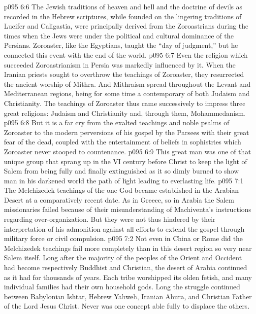 \vs p095 6:6 The Jewish traditions of heaven and hell and the doctrine of devils as recorded in the Hebrew scriptures, while founded on the lingering traditions of Lucifer and Caligastia, were principally derived from the Zoroastrians during the times when the Jews were under the political and cultural dominance of the Persians. Zoroaster, like the Egyptians, taught the “day of judgment,” but he connected this event with the end of the world.
\vs p095 6:7 Even the religion which succeeded Zoroastrianism in Persia was markedly influenced by it. When the Iranian priests sought to overthrow the teachings of Zoroaster, they resurrected the ancient worship of Mithra. And Mithraism spread throughout the Levant and Mediterranean regions, being for some time a contemporary of both Judaism and Christianity. The teachings of Zoroaster thus came successively to impress three great religions: Judaism and Christianity and, through them, Mohammedanism.
\vs p095 6:8 \pc But it is a far cry from the exalted teachings and noble psalms of Zoroaster to the modern perversions of his gospel by the Parsees with their great fear of the dead, coupled with the entertainment of beliefs in sophistries which Zoroaster never stooped to countenance.
\vs p095 6:9 This great man was one of that unique group that sprang up in the VI century before Christ to keep the light of Salem from being fully and finally extinguished as it so dimly burned to show man in his darkened world the path of light leading to everlasting life.
\vs p095 7:1 The Melchizedek teachings of the one God became established in the Arabian Desert at a comparatively recent date. As in Greece, so in Arabia the Salem missionaries failed because of their misunderstanding of Machiventa’s instructions regarding over\hyp{}organization. But they were not thus hindered by their interpretation of his admonition against all efforts to extend the gospel through military force or civil compulsion.
\vs p095 7:2 Not even in China or Rome did the Melchizedek teachings fail more completely than in this desert region so very near Salem itself. Long after the majority of the peoples of the Orient and Occident had become respectively Buddhist and Christian, the desert of Arabia continued as it had for thousands of years. Each tribe worshipped its olden fetish, and many individual families had their own household gods. Long the struggle continued between Babylonian Ishtar, Hebrew Yahweh, Iranian Ahura, and Christian Father of the Lord Jesus Christ. Never was one concept able fully to displace the others.

